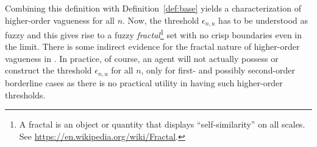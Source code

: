 Combining this definition with Definition~\ref{def:base} yields a characterization of high\-er-order vagueness for all $n$. Now, the threshold $\epsilon_{n,u}$ has to be understood as fuzzy and this gives rise to a fuzzy \emph{fractal}\footnote{A fractal is an object or quantity that displays ``self-similarity'' on all scales. See \url{https://en.wikipedia.org/wiki/Fractal}.} set with no crisp boundaries even in the limit. There is some indirect evidence for the fractal nature of higher-order vagueness in \citet{haamp:re}. In practice, of course, an agent will not actually possess or construct the threshold $\epsilon_{n,u}$ for all $n$, only for first- and possibly second-order borderline cases as there is no practical utility in having such higher-order thresholds.

%
%
%
%
%
%
%

